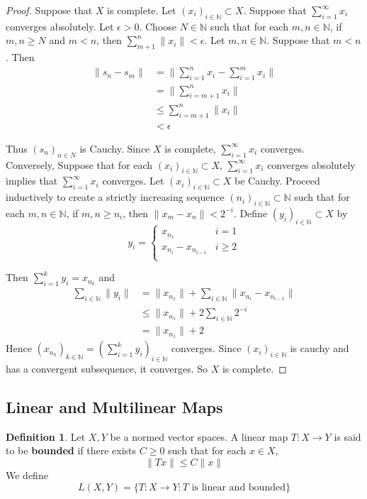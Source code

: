 \documentclass[12pt]{amsart}
\theoremstyle{definition}
\newtheorem{defn}[definition]{Definition}
\theoremstyle{remark}
\theoremstyle{definition}
\newcommand{\ep}{\epsilon}
\newcommand{\N}{\mathbb{N}}
\newcommand{\seq}[2]{(#1_{#2})_{#2 \in \N}}
\begin{document}
	\begin{proof}
		Suppose that $X$ is complete. Let $\seq{x}{i} \subset X$. Suppose that $\sum_{i=1}^{\infty}x_i$ converges absolutely. Let $\ep >0$. Choose $N \in \N$ such that for each $m,n \in \N$, if $m, n \geq N$ and $m< n$, then $\sum_{m+1}^n \|x_i \|< \ep$. Let $m, n \in \N$. Suppose that $m<n$. Then 
		\begin{align*}
			\|s_n-s_m \|
			&= \bigg \|\sum_{i=1}^n x_i -\sum_{i=1}^m x_i\bigg \|\\
			&= \bigg\|\sum_{i=m+1}^{n} x_i \bigg \| \\
			& \leq \sum_{i=m+1}^n \|x_i \|\\
			& < \ep
		\end{align*}
		
		Thus $(s_n)_{n \in N}$ is Cauchy. Since $X$ is complete, $\sum_{i=1}^{\infty}x_i$ converges. \\
		Conversely, Suppose that for each $\seq{x}{i} \subset X$, $\sum_{i =1}^{\infty}x_i$ converges absolutely implies that $\sum_{i=1}^{\infty}x_i$ converges. Let $\seq{x}{i} \subset X$ be Cauchy. Proceed inductively to create a strictly increasing sequence $(n_i)_{i \in \N} \subset \N$ such that for each $m, n \in \N$, if $m,n \geq n_i$, then $ \|x_m-x_n \|< 2^{-i}$. Define $(y_i)_{i \in \N} \subset X$ by 
		\[ y_i = \begin{cases}
			x_{n_1} & i=1 \\
			x_{n_i} - x_{n_{i-1}} & i \geq 2\\
		\end{cases}\]
		
		Then $\sum_{i=1}^k y_i = x_{n_k}$ and 
		\begin{align*}
			\sum_{i \in \N} \|y_i \|
			&= \|x_{n_1} \|+ \sum_{i \in \N} \|x_{n_i}-x_{n_{i-1}} \|\\
			& \leq \|x_{n_1} \|+ 2\sum_{i \in \N}2^{-i}\\
			& = \|x_{n_1} \|+2
		\end{align*}
		Hence $(x_{n_k})_{k \in \N} = (\sum_{i=1}^k y_i)_{i\in \N}$ converges. Since $(x_i)_{i \in \N}$ is cauchy and has a convergent subsequence, it converges. So $X$ is complete.
	\end{proof}
	\newpage
	
	\subsection{Linear and Multilinear Maps}
	
	\begin{defn}
		Let $X,Y$ be a normed vector spaces. A linear map $T:X \rightarrow Y$ is said to be \textbf{bounded} if there exists $C \geq 0$ such that for each $x \in X$, $$\|Tx \|\leq C \|x \|$$ We define $$L(X,Y) = \{T:X \rightarrow Y: T \text{ is linear and bounded}\}$$
	\end{defn}
	
\end{document}
